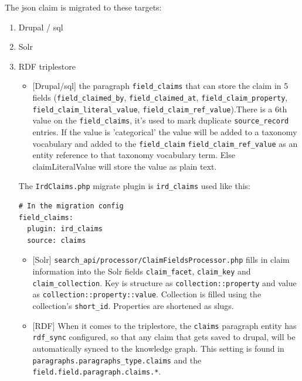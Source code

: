 \documentclass{scrartcl}
\begin{document}
The json claim is migrated to these targets:
\begin{enumerate}
\item Drupal / sql
\item Solr
\item RDF triplestore
\begin{itemize}
\item {[}Drupal/sql] the paragraph \texttt{field\_claims} that can store the claim in 5 fields (\texttt{field\_claimed\_by}, \texttt{field\_claimed\_at}, \texttt{field\_claim\_property}, \texttt{field\_claim\_literal\_value}, \texttt{field\_claim\_ref\_value}).There is a 6th value on the \texttt{field\_claims}, it's used to mark duplicate \texttt{source\_record} entries. If the value is 'categorical' the value will be added to a taxonomy vocabulary and added to the \texttt{field\_claim} \texttt{field\_claim\_ref\_value} as an entity reference to that taxonomy vocabulary term. Else claimLiteralValue will store the value as plain text.
\end{itemize}
The \texttt{IrdClaims.php} migrate plugin is \texttt{ird\_claims} used like this:
\begin{verbatim}
# In the migration config
field_claims:
  plugin: ird_claims
  source: claims

\end{verbatim}
\begin{itemize}
\item {[}Solr] \texttt{search\_api/processor/ClaimFieldsProcessor.php} fills in claim information into the Solr fields \texttt{claim\_facet}, \texttt{claim\_key} and \texttt{claim\_collection}. Key is structure as \texttt{collection::property} and value as \texttt{collection::property::value}. Collection is filled using the collection's \texttt{short\_id}. Properties are shortened as slugs.
\item {[}RDF] When it comes to the triplestore, the \texttt{claims} paragraph entity has \texttt{rdf\_sync} configured, so that any claim that gets saved to drupal, will be automatically synced to the knowledge graph. This setting is found in \texttt{paragraphs.paragraphs\_type.claims} and the \texttt{field.field.paragraph.claims.*}.
\end{itemize}
\end{enumerate}
\end{document}
